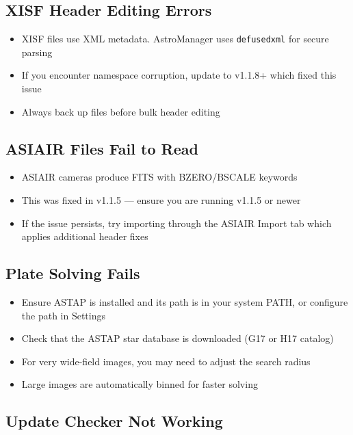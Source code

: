 \documentclass[11pt,a4paper]{article}
\begin{document}
\subsection{XISF Header Editing Errors}

\begin{itemize}
    \item XISF files use XML metadata. AstroManager uses \texttt{defusedxml} for secure parsing
    \item If you encounter namespace corruption, update to v1.1.8+ which fixed this issue
    \item Always back up files before bulk header editing
\end{itemize}

\subsection{ASIAIR Files Fail to Read}

\begin{itemize}
    \item ASIAIR cameras produce FITS with BZERO/BSCALE keywords
    \item This was fixed in v1.1.5 --- ensure you are running v1.1.5 or newer
    \item If the issue persists, try importing through the ASIAIR Import tab which applies additional header fixes
\end{itemize}

\subsection{Plate Solving Fails}

\begin{itemize}
    \item Ensure ASTAP is installed and its path is in your system PATH, or configure the path in Settings
    \item Check that the ASTAP star database is downloaded (G17 or H17 catalog)
    \item For very wide-field images, you may need to adjust the search radius
    \item Large images are automatically binned for faster solving
\end{itemize}

\subsection{Update Checker Not Working}
\end{document}
